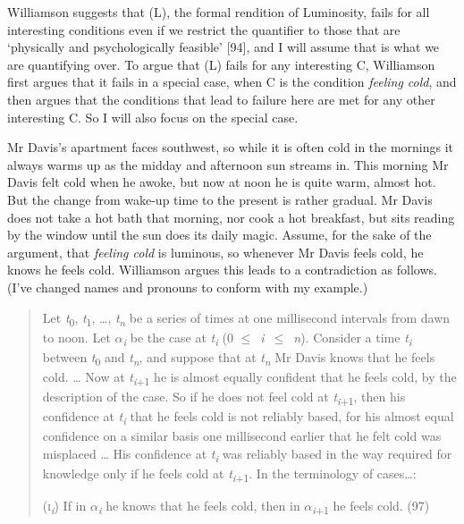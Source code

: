 Williamson suggests that (L), the formal rendition of Luminosity, fails for all interesting conditions even if we restrict the quantifier to those that are `physically and psychologically feasible' [94], and I will assume that is what we are quantifying over. To argue that (L) fails for any interesting C, Williamson first argues that it fails in a special case, when C is the condition \textit{feeling cold}, and then argues that the conditions that lead to failure here are met for any other interesting C. So I will also focus on the special case.

Mr Davis's apartment faces southwest, so while it is often cold in the mornings it always warms up as the midday and afternoon sun streams in. This morning Mr Davis felt cold when he awoke, but now at noon he is quite warm, almost hot. But the change from wake-up time to the present is rather gradual. Mr Davis does not take a hot bath that morning, nor cook a hot breakfast, but sits reading by the window until the sun does its daily magic. Assume, for the sake of the argument, that \textit{feeling cold} is luminous, so whenever Mr Davis feels cold, he knows he feels cold. Williamson argues this leads to a contradiction as follows. (I've changed names and pronouns to conform with my example.)

\begin{quote}
Let \textit{t}\textsubscript{0}, \textit{t}\textsubscript{1}, {\dots}, \textit{t}\textit{\textsubscript{n}} be a series of times at one millisecond intervals from dawn to noon. Let ${\alpha}$\textit{\textsubscript{i}} be the case at \textit{t}\textit{\textsubscript{i}} (0 ${\leq}$~\textit{i}~${\leq}$~\textit{n}). Consider a time \textit{t}\textit{\textsubscript{i}} between \textit{t}\textsubscript{0} and \textit{t}\textit{\textsubscript{n}}, and suppose that at \textit{t}\textit{\textsubscript{n}} Mr Davis knows that he feels cold. {\dots} Now at \textit{t}\textit{\textsubscript{i}}\textsubscript{+1} he is almost equally confident that he feels cold, by the description of the case. So if he does not feel cold at \textit{t}\textit{\textsubscript{i}}\textsubscript{+1}, then his confidence at \textit{t}\textit{\textsubscript{i}} that he feels cold is not reliably based, for his almost equal confidence on a similar basis one millisecond earlier that he felt cold was misplaced {\dots} His confidence at \textit{t}\textit{\textsubscript{i}} was reliably based in the way required for knowledge only if he feels cold at \textit{t}\textit{\textsubscript{i}}\textsubscript{+1}. In the terminology of cases{\dots}:

(\textsc{i}\textit{\textsubscript{i}}) If in ${\alpha}$\textit{\textsubscript{i}} he knows that he feels cold, then in ${\alpha}$\textit{\textsubscript{i}}\textsubscript{+1} he feels cold. (97)
\end{quote}

